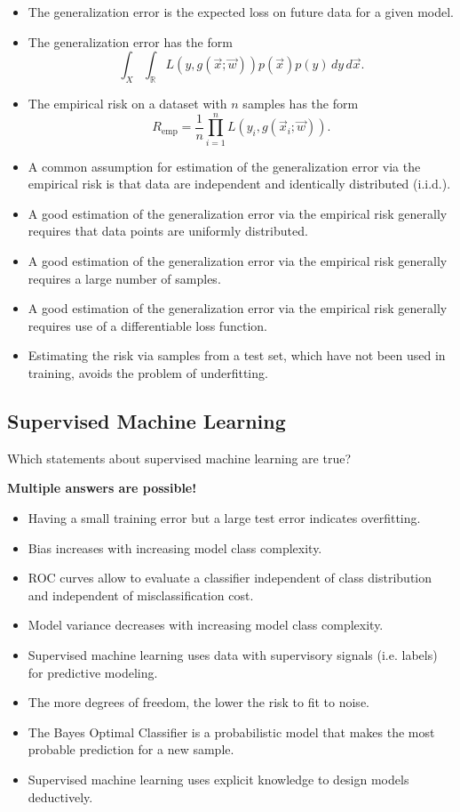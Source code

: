 \documentclass{article}
\begin{document}
\begin{itemize}
    \item[(a)] The generalization error is the expected loss on future data for a given model.
    \item[(b)] The generalization error has the form 
    \[
    \int_X \int_{\mathbb{R}} L(y, g(\vec{x}; \vec{w})) p(\vec{x}) p(y) \, dy \, d\vec{x}.
    \]
    \item[(c)] The empirical risk on a dataset with $n$ samples has the form 
    \[
    R_{\text{emp}} = \frac{1}{n} \prod_{i=1}^n L(y_i, g(\vec{x}_i; \vec{w})).
    \]
    \item[(d)] A common assumption for estimation of the generalization error via the empirical risk is that data are independent and identically distributed (i.i.d.).
    \item[(e)] A good estimation of the generalization error via the empirical risk generally requires that data points are uniformly distributed.
    \item[(f)] A good estimation of the generalization error via the empirical risk generally requires a large number of samples.
    \item[(g)] A good estimation of the generalization error via the empirical risk generally requires use of a differentiable loss function.
    \item[(h)] Estimating the risk via samples from a test set, which have not been used in training, avoids the problem of underfitting.
\end{itemize}

\subsection*{Supervised Machine Learning}

Which statements about supervised machine learning are true?

\textbf{Multiple answers are possible!}

\begin{itemize}
    \item[(a)] Having a small training error but a large test error indicates overfitting.
    \item[(b)] Bias increases with increasing model class complexity.
    \item[(c)] ROC curves allow to evaluate a classifier independent of class distribution and independent of misclassification cost.
    \item[(d)] Model variance decreases with increasing model class complexity.
    \item[(e)] Supervised machine learning uses data with supervisory signals (i.e. labels) for predictive modeling.
    \item[(f)] The more degrees of freedom, the lower the risk to fit to noise.
    \item[(g)] The Bayes Optimal Classifier is a probabilistic model that makes the most probable prediction for a new sample.
    \item[(h)] Supervised machine learning uses explicit knowledge to design models deductively.
\end{itemize}
\end{document}
